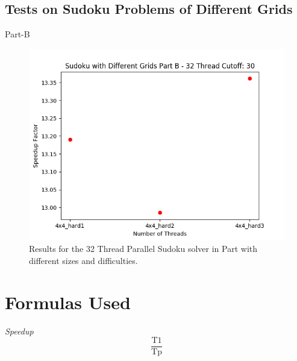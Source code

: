 \documentclass{article}
\begin{document}
\newpage

\subsection{Tests on Sudoku Problems of Different Grids}
\begin{description}
\item[Part-B]
\end{description} 
\begin{figure}[!htb]
    \centering
    \includegraphics[width=1\linewidth]{./img/grids_part_2_B.png}
    \caption{Results for the 32 Thread Parallel Sudoku solver in Part with different sizes and difficulties.}
\end{figure}



\section{Formulas Used}

\begin{enumerate}
\begin{item}
\emph{Speedup} 
\begin{equation*}
\frac{\mathrm{T1}}{\mathrm{Tp}}
\end{equation*}
\end{item}
\end{enumerate}
\end{document}

